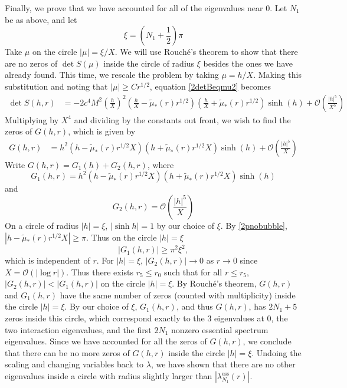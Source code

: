 \documentclass[thesis.tex]{subfiles}
\begin{document}
Finally, we prove that we have accounted for all of the eigenvalues near 0. Let $N_1$ be as above, and let
\[
\xi = \left( N_1 + \frac{1}{2} \right)\pi
\]
Take $\mu$ on the circle $|\mu| = \xi/X$. We will use Rouch\'{e}'s theorem to show that there are no zeros of $\det S(\mu)$ inside the circle of radius $\xi$ besides the ones we have already found. This time, we rescale the problem by taking $\mu = h/X$. Making this substitution and noting that $|\mu| \geq C r^{1/2}$, equation \cref{2detBeqmu2} becomes
\begin{equation}\label{Gcount2}
\begin{aligned}
\det S(h, r) &= -2 c^4 M^2 \left(\frac{h}{X}\right)^2 \left( \frac{h}{X} - \tilde{\mu}_*(r)r^{1/2}\right)\left(\frac{h}{X} + \tilde{\mu}_*(r)r^{1/2}\right) \sinh(h) + \mathcal{O}\left(\frac{|h|^5}{X^5}\right)
\end{aligned}
\end{equation}
Multiplying by $X^4$ and dividing by the constants out front, we wish to find the zeros of $G(h, r)$, which is given by
\begin{equation}\label{Gcount3}
\begin{aligned}
G(h,r) &= h^2 \left( h - \tilde{\mu}_*(r)r^{1/2}X\right)\left(h + \tilde{\mu}_*(r)r^{1/2}X\right) \sinh(h) + \mathcal{O}\left(\frac{|h|^5}{X}\right)
\end{aligned}
\end{equation}
Write $G(h,r) = G_1(h) + G_2(h,r)$, where
\[
G_1(h, r) = h^2 \left( h - \tilde{\mu}_*(r)r^{1/2}X\right)\left(h + \tilde{\mu}_*(r)r^{1/2}X\right) \sinh(h)
\]
and
\[
G_2(h,r) = \mathcal{O}\left(\frac{|h|^5}{X}\right)
\]
On a circle of radius $|h| = \xi$, $|\sinh h| = 1$ by our choice of $\xi$. By \cref{2pnobubble}, $|h - \tilde{\mu}_*(r)r^{1/2}X|\geq \pi$. Thus on the circle $|h| = \xi$
\[
|G_1(h,r)| \geq \pi^2 \xi^2,
\]
which is independent of $r$. For $|h| = \xi$, $|G_2(h,r)| \rightarrow 0$ as $r \rightarrow 0$ since $X = \mathcal{O}(|\log r|)$. Thus there exists $r_5 \leq r_0$ such that for all $r \leq r_5$, $|G_2(h,r)| < |G_1(h,r)|$ on the circle $|h| = \xi$. By Rouch\'{e}'s theorem, $G(h,r)$ and $G_1(h,r)$ have the same number of zeros (counted with multiplicity) inside the circle $|h| = \xi$. By our choice of $\xi$, $G_1(h,r)$, and thus $G(h,r)$, has $2 N_1 + 5$ zeros inside this circle, which correspond exactly to the 3 eigenvalues at 0, the two interaction eigenvalues, and the first $2 N_1$ nonzero essential spectrum eigenvalues. Since we have accounted for all the zeros of $G(h,r)$, we conclude that there can be no more zeros of $G(h,r)$ inside the circle $|h| = \xi$. Undoing the scaling and changing variables back to $\lambda$, we have shown that there are no other eigenvalues inside a circle with radius slightly larger than $|\lambda_{N_1}^{\text{ess}}(r)|$.
\end{document}
